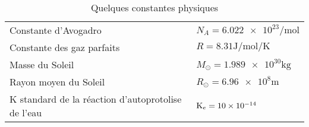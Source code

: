 \documentclass[10pt,a4paper,titlepage,portrait]{article}
\begin{document}
\begin{center}
\begin{table}[H]
\begin{tabular}{@{}p{9cm}p{10cm}@{}}
    Constante d'Avogadro & $N_A = \num{6,022e23} \unit{\per\mole}$ \\ 
    Constante des gaz parfaits & $R = \num{8,31} \unit{\joule\per\mole\per\kelvin}$ \\ 
    Masse du Soleil & $M_\odot = \num{1,989e30} \unit{\kilogram}$ \\  
    Rayon moyen du Soleil & $R_\odot = \num{6,96e8} \unit{\meter}$ \\ 
    K standard de la réaction d'autoprotolise de l'eau & $\mathrm{K}_e= \num{10e{-14}}$ \\
    \bottomrule
\end{tabular}
\caption{Quelques constantes physiques}
\label{tab:constantes}
\end{table}
    
\end{center}
\end{document}
